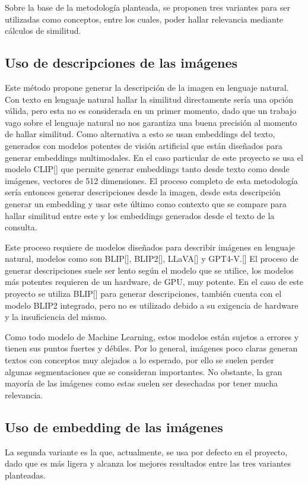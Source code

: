 Sobre la base de la metodolog\'ia planteada, se proponen tres variantes para ser utilizadas como conceptos, entre los cuales, poder hallar relevancia mediante cálculos de similitud.

\subsection{Uso de descripciones de las imágenes}
Este método propone generar la descripción de la imagen en lenguaje natural. Con texto en lenguaje natural hallar la similitud directamente sería una opción válida, pero esta no es considerada en un primer momento, dado que un trabajo vago sobre el lenguaje natural no nos garantiza una buena precisión al momento de hallar similitud. Como alternativa a esto se usan embeddings del texto, generados con modelos potentes de visión artificial que están diseñados para generar embeddings multimodales. En el caso particular de este proyecto se usa el modelo CLIP[\cite{clip}] que permite generar embeddings tanto desde texto como desde imágenes, vectores de 512 dimensiones. El proceso completo de esta metodología sería entonces generar descripciones desde la imagen, desde esta descripción generar un embedding y usar este último como contexto que se compare para hallar similitud entre este y los embeddings generados desde el texto de la consulta.

Este proceso requiere de modelos diseñados para describir imágenes en lenguaje natural, modelos como son BLIP[\cite{blip}], BLIP2[\cite{blip-2}], LLaVA[\cite{llava}] y GPT4-V.[\cite{gpt-4v}] El proceso de generar descripciones suele ser lento según el modelo que se utilice, los modelos más potentes requieren de un hardware, de GPU, muy potente. En el caso de este proyecto se utiliza BLIP[\cite{blip}] para generar descripciones, también cuenta con el modelo BLIP2 integrado, pero no es utilizado debido a su exigencia de hardware y la insuficiencia del mismo.

Como todo modelo de Machine Learning, estos modelos están sujetos a errores y tienen sus puntos fuertes y débiles. Por lo general, imágenes poco claras generan textos con conceptos muy alejados a lo esperado, por ello se suelen perder algunas segmentaciones que se consideran importantes. No obstante, la gran mayoría de las imágenes como estas suelen ser desechadas por tener mucha relevancia.

\subsection{Uso de embedding de las imágenes}
La segunda variante es la que, actualmente, se usa por defecto en el proyecto, dado que es más ligera y alcanza los mejores resultados entre las tres variantes planteadas.

